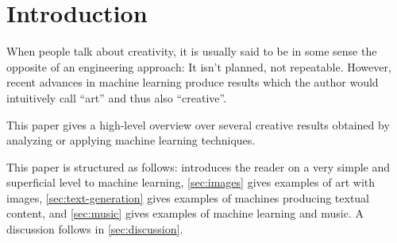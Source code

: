
\section{Introduction}
\label{sec:introduction}
When people talk about creativity, it is usually said to be in some sense the
opposite of an engineering approach: It isn't planned, not repeatable. However,
recent advances in machine learning produce results which the author would
intuitively call \enquote{art} and thus also \enquote{creative}.

This paper gives a high-level overview over several creative results obtained
by analyzing or applying machine learning techniques.

This paper is structured as follows:  introduces the
reader on a very simple and superficial level to machine learning,
\cref{sec:images} gives examples of art with images, \cref{sec:text-generation}
gives examples of machines producing textual content, and \cref{sec:music}
gives examples of machine learning and music. A discussion follows in
\cref{sec:discussion}.
